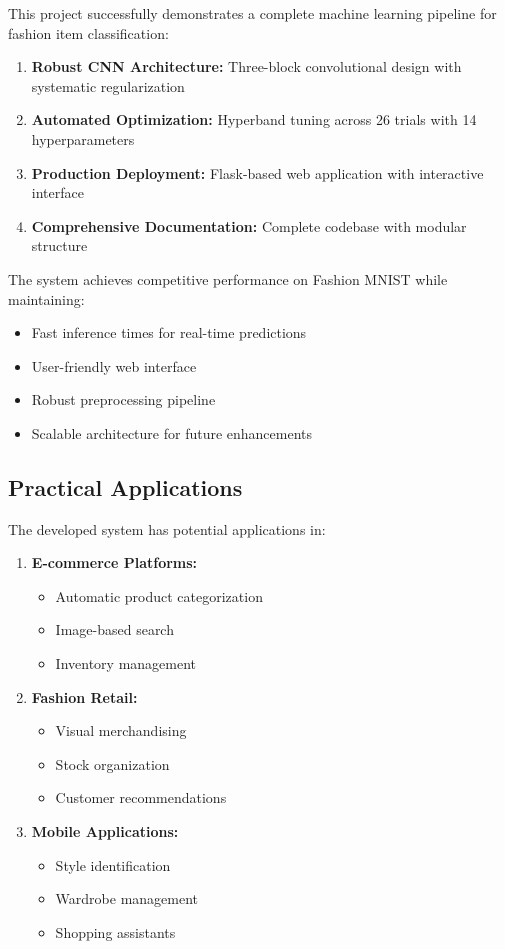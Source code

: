 \documentclass[12pt,a4paper]{article}
\begin{document}
This project successfully demonstrates a complete machine learning pipeline for fashion item classification:

\begin{enumerate}
    \item \textbf{Robust CNN Architecture:} Three-block convolutional design with systematic regularization
    \item \textbf{Automated Optimization:} Hyperband tuning across 26 trials with 14 hyperparameters
    \item \textbf{Production Deployment:} Flask-based web application with interactive interface
    \item \textbf{Comprehensive Documentation:} Complete codebase with modular structure
\end{enumerate}

The system achieves competitive performance on Fashion MNIST while maintaining:
\begin{itemize}
    \item Fast inference times for real-time predictions
    \item User-friendly web interface
    \item Robust preprocessing pipeline
    \item Scalable architecture for future enhancements
\end{itemize}

\subsection{Practical Applications}

The developed system has potential applications in:

\begin{enumerate}
    \item \textbf{E-commerce Platforms:}
    \begin{itemize}
        \item Automatic product categorization
        \item Image-based search
        \item Inventory management
    \end{itemize}
    
    \item \textbf{Fashion Retail:}
    \begin{itemize}
        \item Visual merchandising
        \item Stock organization
        \item Customer recommendations
    \end{itemize}
    
    \item \textbf{Mobile Applications:}
    \begin{itemize}
        \item Style identification
        \item Wardrobe management
        \item Shopping assistants
    \end{itemize}
\end{enumerate}
\end{document}
